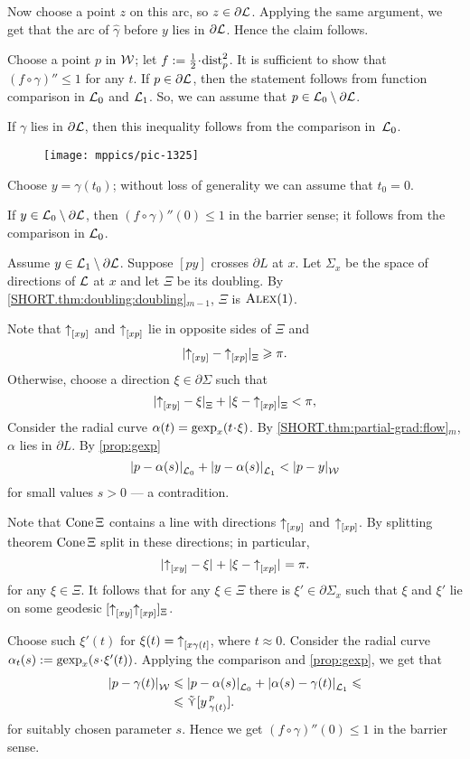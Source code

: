 Now choose a point $z$ on this arc, so $z\in \partial\mathcal{L}$.
Applying the same argument, we get that the arc of $\hat\gamma$ before $y$ lies in $\partial\mathcal{L}$.
Hence the claim follows.\claimqeds

Choose a point $p$ in $\mathcal{W}$;
let $f\df\tfrac12\cdot\distfun_p^2$.
It is sufficient to show that $(f\circ\gamma)''\le 1$ for any $t$.
If $p\in \partial\mathcal{L}$, then the statement follows from function comparison in $\mathcal{L}_0$ and $\mathcal{L}_1$.
So, we can assume that $p\in \mathcal{L}_0\setminus \partial\mathcal{L}$.

If $\gamma$ lies in $\partial \mathcal{L}$, then this inequality follows from the comparison in~$\mathcal{L}_0$.

\begin{wrapfigure}{r}{45mm}
\vskip-2mm
\centering
\texttt{[image: mppics/pic-1325]}
\end{wrapfigure}

Choose $y=\gamma(t_0)$; without loss of generality we can assume that $t_0=0$.

If $y\z\in \spc{L}_0\setminus\partial\spc{L}$, then $(f\circ\gamma)''(0)\le 1$ in the barrier sense;
it follows from the comparison in $\mathcal{L}_0$.

Assume $y\in \mathcal{L}_1\setminus\partial\mathcal{L}$.
Suppose $[py]$ crosses $\partial L$ at $x$.
Let $\Sigma_x$ be the space of directions of $\mathcal{L}$ at $x$
and let $\Xi$ be its doubling.
By \ref{SHORT.thm:doubling:doubling}$_{m-1}$, $\Xi$ is $\textsc{Alex}(1)$.

Note that ${\uparrow}_{[{x}{y}]}$ and ${\uparrow}_{[{x}{p}]}$ lie in opposite sides of $\Xi$ and
\[\dist{\dir x{y}}{\dir xp}\Xi\ge \pi.\]
Otherwise, choose a direction $\xi\in\partial\Sigma$ such that
\[\dist{\dir x{y}}{\xi}\Xi+\dist{\xi}{\dir xp}\Xi<\pi,\]
Consider the radial curve $\alpha(t)=\gexp_x(t\cdot \xi)$.
By \ref{SHORT.thm:partial-grad:flow}$_m$, $\alpha$ lies in $\partial L$.
By \ref{prop:gexp}
\[\dist{p}{\alpha(s)}{\spc{L}_0}
+\dist{y}{\alpha(s)}{\spc{L}_1}
<\dist{p}{y}{\spc{W}}\]
for small values $s>0$
--- a contradition.

Note that $\mathop{\rm Cone}\nolimits \Xi$ contains a line with directions ${\uparrow}_{[{x}{y}]}$ and ${\uparrow}_{[{x}{p}]}$.
By splitting theorem $\mathop{\rm Cone}\nolimits \Xi$ split in these directions;
in particular, 
\[\dist{\dir x{y}}{\xi}{}+\dist{\xi}{\dir xp}{}=\pi.\]
for any $\xi\in\Xi$.
It follows that for any $\xi\in\Xi$ there is $\xi'\in\partial\Sigma_x$ such that 
$\xi$ and $\xi'$ lie on some geodesic $[{\uparrow}_{[{x}{y}]} {\uparrow}_{[{x}{p}]}]_\Xi$.

Choose such $\xi'(t)$ for $\xi(t)={\uparrow}_{[{x}{\gamma(t}]}$, where $t\approx 0$.
Consider the radial curve $\alpha_t(s)\df\gexp_x(s\cdot\xi'(t))$.
Applying the comparison and \ref{prop:gexp}, we get that 
\begin{align*}
\dist{p}{\gamma(t)}{\spc{W}}
&\le \dist{p}{\alpha(s)}{\spc{L}_0}+ \dist{\alpha(s)}{\gamma(t)}{\spc{L}_1}\le
\\
&\le \side\hinge yp{\gamma(t)}.
\end{align*}
for suitably chosen parameter $s$. 
Hence we get $(f\circ\gamma)''(0)\le 1$ in the barrier sense.

